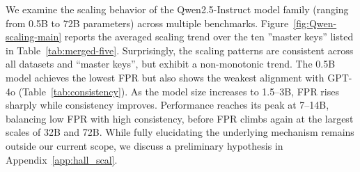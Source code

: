 We examine the scaling behavior of the Qwen2.5-Instruct model family (ranging from 0.5B to 72B parameters) across multiple benchmarks. Figure~\ref{fig:Qwen-scaling-main} reports the averaged scaling trend over the ten ''master keys” listed in Table~\ref{tab:merged-five}.  Surprisingly, the scaling patterns are consistent across all datasets and ``master keys'', but exhibit a non-monotonic trend. The 0.5B model achieves the lowest FPR but also shows the weakest alignment with GPT-4o (Table~\ref{tab:consistency}). As the model size increases to 1.5–3B, FPR rises sharply while consistency improves. Performance reaches its peak at 7–14B, balancing low FPR with high consistency, before FPR climbs again at the largest scales of 32B and 72B. While fully elucidating the underlying mechanism remains outside our current scope, we discuss a preliminary hypothesis in Appendix~\ref{app:hall_scal}.





